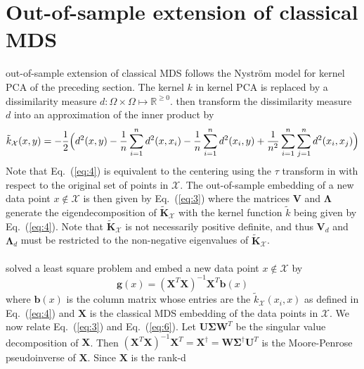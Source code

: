 \documentclass{article}
\begin{document}
\section{Out-of-sample extension of classical MDS}
\cite{bengio04:_out_lle_isomap_mds_eigen} out-of-sample extension of
classical MDS follows the Nystr\"{o}m model for kernel PCA of the
preceding section. The kernel $k$ in kernel PCA is replaced by a
dissimilarity measure $d \colon \Omega \times \Omega \mapsto
\mathbb{R}^{\geq 0}$. \cite{bengio04:_out_lle_isomap_mds_eigen} then
transform the dissimilarity measure $d$ into an approximation of the
inner product by
\begin{equation}
  \label{eq:4}
  \tilde{k}_{\mathcal{X}}(x,y) = -\frac{1}{2}\Bigl(d^{2}(x,y) -  \frac{1}{n}\sum_{i=1}^{n}d^{2}(x,x_i) -
  \frac{1}{n}\sum_{i=1}^{n}d^{2}(x_i,y) + 
\frac{1}{n^2}\sum_{i=1}^{n}\sum_{j=1}^{n}d^{2}(x_i,x_j)\Bigr)
\end{equation}
Note that Eq.~(\ref{eq:4}) is equivalent to the centering using the
$\tau$ transform in \citet{trosset08} with respect
to the original set of points in $\mathcal{X}$. The out-of-sample
embedding of a new data point $x \not \in \mathcal{X}$ is then given
by Eq.~(\ref{eq:3}) where the matrices $\mathbf{V}$ and $\bm{\Lambda}$
generate the eigendecomposition of $
\tilde{\mathbf{K}}_{\mathcal{X}}$ with the kernel function $\tilde{k}$
being given by Eq.~(\ref{eq:4}). Note that
$\tilde{\mathbf{K}}_{\mathcal{X}}$ is not necessarily positive
definite, and thus $\mathbf{V}_d$ and $\bm{\Lambda}_{d}$ must
be restricted to the non-negative eigenvalues of
$\tilde{\mathbf{K}}_{\mathcal{X}}$. \\ \\
%
\cite{anderson03:_gener} solved a least square problem and embed a new
data point $x \not \in \mathcal{X}$ by 
\begin{equation}
  \label{eq:6}
   \mathbf{g}(x) = (\mathbf{X}^{T}\mathbf{X})^{-1}\mathbf{X}^{T} \mathbf{b}(x)
\end{equation}
where $\mathbf{b}(x)$ is the column matrix whose entries are the
$\tilde{k}_{\mathcal{X}}(x_i,x)$ as defined in Eq.~(\ref{eq:4}) and
$\mathbf{X}$ is the classical MDS embedding of the data points in
$\mathcal{X}$. We now relate Eq.~(\ref{eq:3}) and
Eq.~(\ref{eq:6}). Let $\mathbf{U}\bm{\Sigma}\mathbf{W}^{T}$ be the
singular value decomposition of $\mathbf{X}$. Then
$(\mathbf{X}^{T}\mathbf{X})^{-1}\mathbf{X}^{T} = \mathbf{X}^{\dagger}
= \mathbf{W}\bm{\Sigma}^{\dagger}\mathbf{U}^{T}$ is the Moore-Penrose
pseudoinverse of $\mathbf{X}$. Since $\mathbf{X}$ is the rank-d
\end{document}
